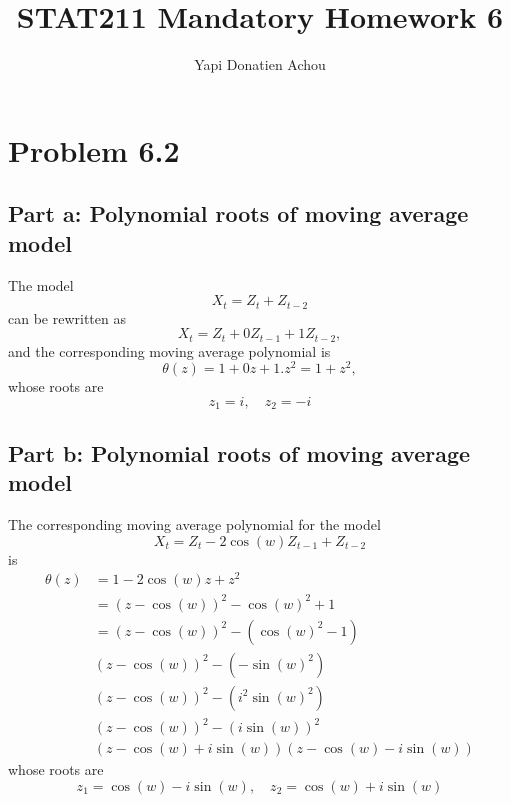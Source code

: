 \documentclass[11pt, oneside]{article}   	%
\title{STAT211 Mandatory Homework 6}
\author{Yapi Donatien Achou}
\begin{document}
\maketitle 
\tableofcontents
\newpage
 
 
 \section{Problem 6.2}
 \subsection{Part a: Polynomial roots of moving average model}
 The model
 \begin{equation}
 X_{t} = Z_{t} + Z_{t-2}
 \end{equation}
 can be rewritten as 
 \begin{equation}
 X_{t} = Z_{t} + 0Z_{t-1} + 1Z_{t-2},
 \end{equation}
 and the corresponding moving average polynomial is
 \begin{equation}
 \theta(z) = 1+ 0z + 1.z^{2} = 1 + z^{2},
 \end{equation}
 whose roots are 
 \begin{equation}
 z_{1} = i, \quad z_{2} = -i
 \end{equation}
 \subsection{Part b: Polynomial roots of moving average model}
 The corresponding moving average polynomial for the model
 \begin{equation}
 X_{t} = Z_{t}  -2\cos(w)Z_{t-1} + Z_{t-2}
 \end{equation}
  is 
 \begin{equation}
 \begin{split}
 \theta(z) &= 1-2\cos(w)z + z^{2}\\
 &=(z-\cos(w))^{2} - \cos(w)^{2} +1 \\
 &=(z-\cos(w))^{2} - (\cos(w)^{2} -1) \\
 &(z-\cos(w))^{2}  - (-\sin(w)^{2})\\
 &(z-\cos(w))^{2}  - (i^{2}\sin(w)^{2})\\
 &(z-\cos(w))^{2}  - (i\sin(w))^{2}\\
&(z-\cos(w) + i\sin(w))(z-\cos(w) - i\sin(w))
 \end{split}
 \end{equation}
 whose roots are 
 \begin{equation}
 z_{1} = \cos(w) -i\sin(w), \quad  z_{2} = \cos(w) +i\sin(w)
 \end{equation}
 
\end{document}
